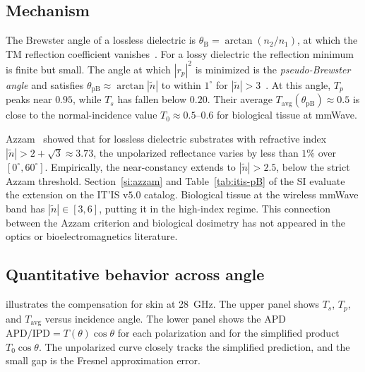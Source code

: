 \documentclass[journal,twocolumn,10pt]{IEEEtran}
\theoremstyle{plain}
\theoremstyle{remark}
\newcommand{\IPD}{\mathrm{IPD}}
\newcommand{\APD}{\mathrm{APD}}
\newcommand{\Tavg}{T_{\mathrm{avg}}}
\newcommand{\ntilde}{\tilde{n}}
\begin{document}
\subsection{Mechanism}\label{subsec:pB-mech}
The Brewster angle of a lossless dielectric is $\theta_{\mathrm{B}} =
\arctan(n_2/n_1)$, at which the TM reflection coefficient
vanishes~\cite{BornWolf1999}. For a lossy dielectric the reflection
minimum is finite but small. The angle at which $|r_p|^2$ is
minimized is the \textit{pseudo-Brewster angle} and satisfies
$\theta_{\mathrm{pB}} \approx \arctan|\ntilde|$ to within $1^\circ$ for
$|\ntilde| > 3$~\cite{Potter1970,Ohman1977}. At this angle, $T_p$
peaks near $0.95$, while $T_s$ has fallen below $0.20$. Their
average $\Tavg(\theta_{\mathrm{pB}}) \approx 0.5$ is close to the
normal-incidence value $T_0 \approx 0.5$--$0.6$ for biological
tissue at mmWave.

Azzam~\cite{Azzam2015} showed that for lossless dielectric substrates
with refractive index $|\ntilde| > 2 + \sqrt{3} \approx 3.73$, the
unpolarized reflectance varies by less than $1\%$ over $[0^\circ,
60^\circ]$. Empirically, the near-constancy extends to $|\ntilde| > 2.5$,
below the strict Azzam threshold. Section~\ref{si:azzam} and
Table~\ref{tab:itis-pB} of the SI evaluate the extension on the
IT'IS v$5.0$ catalog. Biological tissue at the wireless mmWave
band has $|\ntilde| \in [3, 6]$, putting it in the high-index
regime. This connection between the Azzam criterion and biological dosimetry
has not appeared in the optics or bioelectromagnetics literature.

\subsection{Quantitative behavior across angle}\label{subsec:pB-quant}
 illustrates the compensation for skin at
28~GHz. The upper panel shows $T_s$, $T_p$, and $\Tavg$ versus
incidence angle. The lower panel shows the \gls{APD}
$\APD/\IPD = T(\theta)\cos\theta$ for each polarization and for the
simplified product $T_0\cos\theta$. The unpolarized curve closely
tracks the simplified prediction, and the small gap is the Fresnel
approximation error.
\end{document}

